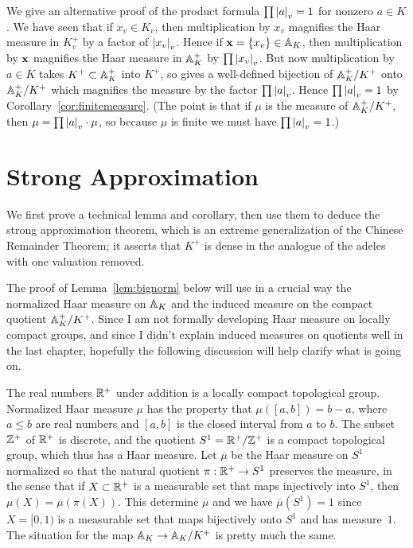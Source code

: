 \begin{remark}\label{rem:conceptual_prod}
  We give an alternative proof of the product formula
  $\prod\abs{a}_v=1$ for nonzero $a\in K$.  We have seen that if
  $x_v\in K_v$, then multiplication by $x_v$ magnifies the Haar
  measure in $K_v^+$ by a factor of $\abs{x_v}_v$.  Hence if
  $\bx=\{x_v\}\in\AA_K$, then multiplication by $\bx$ magnifies the
  Haar measure in $\AA_K^+$ by $\prod \abs{x_v}_v$.  But now
  multiplication by $a\in K$ takes $K^+\subset \AA_K^+$ into $K^+$, so
  gives a well-defined bijection of $\AA_K^+/K^+$ onto $\AA_K^+/K^+$
  which magnifies the measure by the factor $\prod\abs{a}_v$.  Hence
  $\prod\abs{a}_v=1$ by Corollary~\ref{cor:finitemeasure}.  (The point is
  that if $\mu$ is the measure of $\AA_K^+/K^+$, then $\mu =
  \prod\abs{a}_v \cdot \mu$, so because $\mu$ is finite we must have
  $\prod\abs{a}_v = 1$.)
\end{remark}


\section{Strong Approximation}
We first prove a technical lemma and corollary, then use them to
deduce the strong approximation theorem, which is an extreme
generalization of the Chinese Remainder Theorem; it asserts that $K^+$
is dense in the analogue of the adeles with one valuation removed.

The proof of Lemma~\ref{lem:bignorm} below will use in a crucial way
the normalized Haar measure on $\AA_K$ and the induced measure on the
compact quotient $\AA_K^+/K^+$.  Since I am not formally developing
Haar measure on locally compact groups, and since I didn't explain
induced measures on quotients well in the last chapter, hopefully the
following discussion will help clarify what is going on.

The real numbers $\R^+$ under addition is a locally compact
topological group.  Normalized Haar measure $\mu$ has the property
that $\mu([a,b]) = b-a$, where $a\leq b$ are real numbers and
$[a,b]$ is the closed interval from $a$ to $b$.  The subset
$\Z^+$ of $\R^+$ is discrete, and the quotient $S^1 = \R^+/\Z^+$
is a compact topological group, which thus
has a Haar measure.  Let $\overline{\mu}$ be the Haar measure
on $S^1$ normalized so that  the natural quotient $\pi:\R^+\to S^1$
preserves the measure, in the sense that if $X\subset \R^+$
is a measurable set that maps injectively into $S^1$, then
$\mu(X) = \overline{\mu}(\pi(X))$.  This determine
$\overline{\mu}$ and we have $\overline{\mu}(S^1)=1$ since
$X=[0,1)$ is a measurable set that maps bijectively onto
$S^1$ and has measure~$1$.  The situation for the map
$\AA_K \to \AA_K/K^+$ is pretty much the same.


